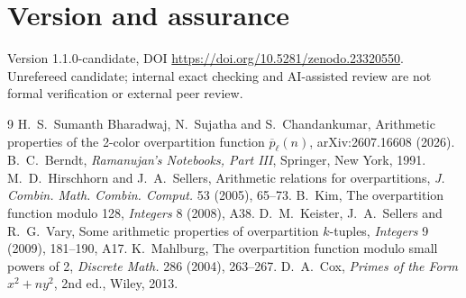 \documentclass[11pt]{article}
\theoremstyle{remark}\newtheorem{remark}[theorem]{Remark}
\begin{document}
\section*{Version and assurance}
Version 1.1.0-candidate, DOI \url{https://doi.org/10.5281/zenodo.23320550}. Unrefereed candidate; internal exact checking and AI-assisted review are not formal verification or external peer review.
\begin{thebibliography}{9}
 H.~S.~Sumanth Bharadwaj, N.~Sujatha and S.~Chandankumar, Arithmetic properties of the 2-color overpartition function $\overline{p}_\ell(n)$, arXiv:2607.16608 (2026).
 B.~C.~Berndt, \emph{Ramanujan's Notebooks, Part III}, Springer, New York, 1991.
 M.~D.~Hirschhorn and J.~A.~Sellers, Arithmetic relations for overpartitions, \emph{J. Combin. Math. Combin. Comput.} 53 (2005), 65--73.
 B.~Kim, The overpartition function modulo 128, \emph{Integers} 8 (2008), A38.
 D.~M.~Keister, J.~A.~Sellers and R.~G.~Vary, Some arithmetic properties of overpartition $k$-tuples, \emph{Integers} 9 (2009), 181--190, A17.
 K.~Mahlburg, The overpartition function modulo small powers of 2, \emph{Discrete Math.} 286 (2004), 263--267.
 D.~A.~Cox, \emph{Primes of the Form $x^2+ny^2$}, 2nd ed., Wiley, 2013.
\end{thebibliography}
\end{document}
